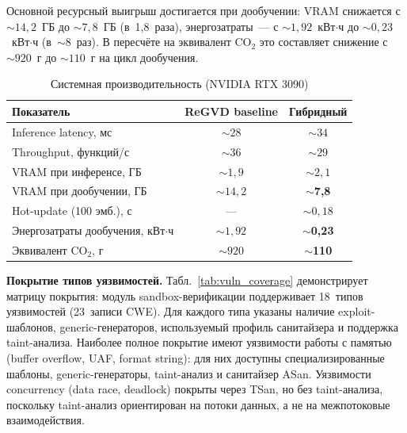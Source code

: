 \documentclass[runningheads]{llncs}
\begin{document}
Основной ресурсный выигрыш достигается при дообучении: VRAM снижается с ${\sim}14{,}2$~ГБ до ${\sim}7{,}8$~ГБ (в~1,8~раза), энергозатраты~--- с ${\sim}1{,}92$~кВт$\cdot$ч до ${\sim}0{,}23$~кВт$\cdot$ч (в~${\sim}8$~раз). В пересчёте на эквивалент CO$_2$ это составляет снижение с ${\sim}920$~г до ${\sim}110$~г на цикл дообучения.

\begin{table}
\centering
\caption{Системная производительность (NVIDIA RTX 3090)}
\label{tab:performance}
\small
\begin{tabular}{|l|c|c|}
\hline
\textbf{Показатель} & \textbf{ReGVD baseline} & \textbf{Гибридный} \\
\hline
Inference latency, мс & ${\sim}28$ & ${\sim}34$ \\
Throughput, функций/с & ${\sim}36$ & ${\sim}29$ \\
VRAM при инференсе, ГБ & ${\sim}1{,}9$ & ${\sim}2{,}1$ \\
VRAM при дообучении, ГБ & ${\sim}14{,}2$ & ${\sim}$\textbf{7,8} \\
Hot-update (100 эмб.), с & --- & ${\sim}0{,}18$ \\
Энергозатраты дообучения, кВт$\cdot$ч & ${\sim}1{,}92$ & ${\sim}$\textbf{0,23} \\
Эквивалент CO$_2$, г & ${\sim}920$ & ${\sim}$\textbf{110} \\
\hline
\end{tabular}
\end{table}

\textbf{Покрытие типов уязвимостей.}
Табл.~\ref{tab:vuln_coverage} демонстрирует матрицу покрытия: модуль sandbox-верификации поддерживает 18~типов уязвимостей (23~записи CWE). Для каждого типа указаны наличие exploit-шаблонов, generic-генераторов, используемый профиль санитайзера и поддержка taint-анализа. Наиболее полное покрытие имеют уязвимости работы с памятью (buffer overflow, UAF, format string): для них доступны специализированные шаблоны, generic-генераторы, taint-анализ и санитайзер ASan. Уязвимости concurrency (data race, deadlock) покрыты через TSan, но без taint-анализа, поскольку taint-анализ ориентирован на потоки данных, а не на межпотоковые взаимодействия.
\end{document}
